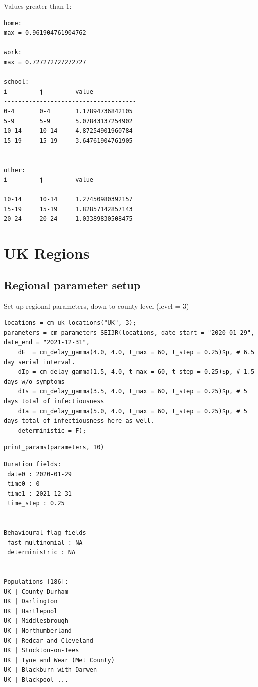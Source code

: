 \documentclass[11pt]{article}
\begin{document}
Values greater than 1:
\begin{verbatim}
home:
max = 0.961904761904762

work:
max = 0.727272727272727

school:
i         j         value
-------------------------------------
0-4       0-4       1.17894736842105
5-9       5-9       5.07843137254902
10-14     10-14     4.87254901960784
15-19     15-19     3.64761904761905


other:
i         j         value
-------------------------------------
10-14     10-14     1.27450980392157
15-19     15-19     1.82857142857143
20-24     20-24     1.03389830508475
\end{verbatim}

\section{UK Regions}
\label{sec:orge342611}
\subsection{Regional parameter setup}
\label{sec:orgfbdf340}
Set up regional parameters, down to county level (level = 3)
\begin{verbatim}
locations = cm_uk_locations("UK", 3);
parameters = cm_parameters_SEI3R(locations, date_start = "2020-01-29", date_end = "2021-12-31",
    dE  = cm_delay_gamma(4.0, 4.0, t_max = 60, t_step = 0.25)$p, # 6.5 day serial interval.
    dIp = cm_delay_gamma(1.5, 4.0, t_max = 60, t_step = 0.25)$p, # 1.5 days w/o symptoms
    dIs = cm_delay_gamma(3.5, 4.0, t_max = 60, t_step = 0.25)$p, # 5 days total of infectiousness
    dIa = cm_delay_gamma(5.0, 4.0, t_max = 60, t_step = 0.25)$p, # 5 days total of infectiousness here as well.
    deterministic = F);
\end{verbatim}

\begin{verbatim}
print_params(parameters, 10)
\end{verbatim}

\begin{verbatim}
Duration fields:
 date0 : 2020-01-29
 time0 : 0
 time1 : 2021-12-31
 time_step : 0.25


Behavioural flag fields
 fast_multinomial : NA
 deterministric : NA


Populations [186]:
UK | County Durham
UK | Darlington
UK | Hartlepool
UK | Middlesbrough
UK | Northumberland
UK | Redcar and Cleveland
UK | Stockton-on-Tees
UK | Tyne and Wear (Met County)
UK | Blackburn with Darwen
UK | Blackpool ...
\end{verbatim}
\end{document}
